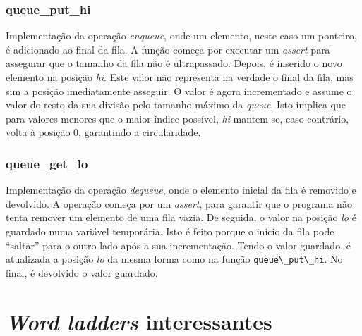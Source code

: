 \documentclass[portuguese,11pt,a4paper,titlepage]{article}
\newcommand{\foreign}[1]{\textit{#1}}
\begin{document}
\subsubsection{queue\_put\_hi}
Implementação da operação \foreign{enqueue}, onde um elemento, neste
caso um ponteiro, é adicionado ao final da fila. A função começa por executar um
\foreign{assert} para assegurar que o tamanho da fila não é ultrapassado. Depois,
é inserido o novo elemento na posição \foreign{hi}. Este valor não representa na
verdade o final da fila, mas sim a posição imediatamente asseguir. O valor é agora
incrementado e assume o valor do resto da sua divisão pelo tamanho máximo da 
\foreign{queue}. Isto implica que para valores menores que o maior índice possível, \foreign{hi} mantem-se, caso contrário, volta à posição 0, garantindo a circularidade.

\subsubsection{queue\_get\_lo}
Implementação da operação \foreign{dequeue}, onde o elemento inicial da fila é
removido e devolvido. A operação começa por um \foreign{assert}, para garantir
que o programa não tenta remover um elemento de uma fila vazia. De seguida, o valor
na posição \foreign{lo} é guardado numa variável temporária. Isto é feito porque
o inicio da fila pode ``saltar'' para o outro lado após a sua incrementação. Tendo
o valor guardado, é atualizada a posição \foreign{lo} da mesma forma como na função
\verb|queue\_put\_hi|. No final, é devolvido o valor guardado.

\section{\textit{Word ladders} interessantes}
\end{document}
